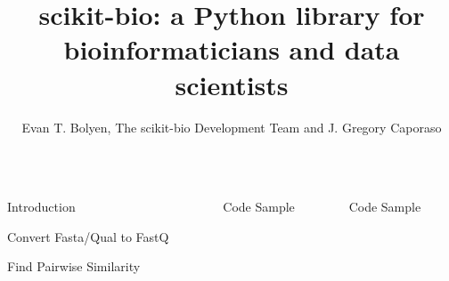 \documentclass[final,t]{beamer}
\title{\huge scikit-bio: a Python library for bioinformaticians and data scientists}
\author{Evan T. Bolyen, The scikit-bio Development Team and J. Gregory Caporaso}
\institute{Affiliations go here}
\begin{document}
\begin{frame}{}
  \begin{columns}[t]
    \begin{column}{.3\linewidth}


      \begin{block}{Introduction}
          \lipsum[1-2]
      \end{block}


      \begin{block}{Convert Fasta/Qual to FastQ}
      \end{block}


      \begin{block}{Find Pairwise Similarity}
        \newline\newline
      \end{block}

    \end{column}
    \begin{column}{.3\linewidth}

        \begin{block}{Code Sample}
        \end{block}

    \end{column}


    \begin{column}{.3\linewidth}


        \begin{block}{Code Sample}
        \end{block}

    \end{column}
  \end{columns}
\end{frame}
\end{document}
